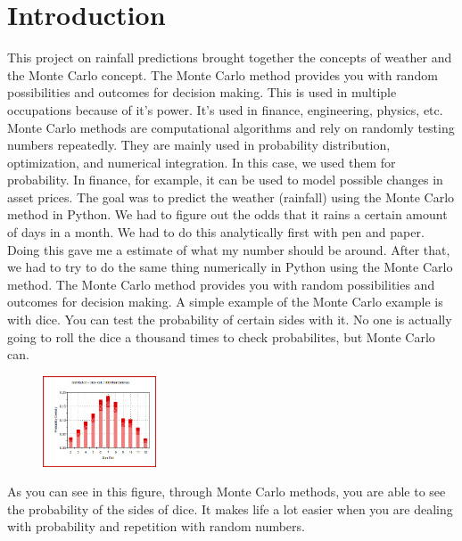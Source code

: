\documentclass[twocolumn]{revtex4}
\begin{document}
\section{Introduction}
This project on rainfall predictions brought together the concepts of weather and the Monte Carlo concept. The Monte Carlo method provides you with random possibilities and outcomes for decision making. This is used in multiple occupations because of it's power. It's used in finance, engineering, physics, etc. Monte Carlo methods are computational algorithms and rely on randomly testing numbers repeatedly. They are mainly used in probability distribution, optimization, and numerical integration. In this case, we used them for probability. In finance, for example, it can be used to model possible changes in asset prices. The goal was to predict the weather (rainfall) using the Monte Carlo method in Python. We had to figure out the odds that it rains a certain amount of days in a month. We had to do this analytically first with pen and paper. Doing this gave me a estimate of what my number should be around. After that, we had to try to do the same thing numerically in Python using the Monte Carlo method. The Monte Carlo method provides you with random possibilities and outcomes for decision making. A simple example of the Monte Carlo example is with dice. You can test the probability of certain sides with it. No one is actually going to roll the dice a thousand times to check probabilites, but Monte Carlo can. 


\begin{figure}
\centering
\includegraphics[width=0.3\textwidth]{DiceRoll1000.jpg} 
\end{figure}

As you can see in this figure, through Monte Carlo methods, you are able to see the probability of the sides of dice. It makes life a lot easier when you are dealing with probability and repetition with random numbers. 

\end{document}
